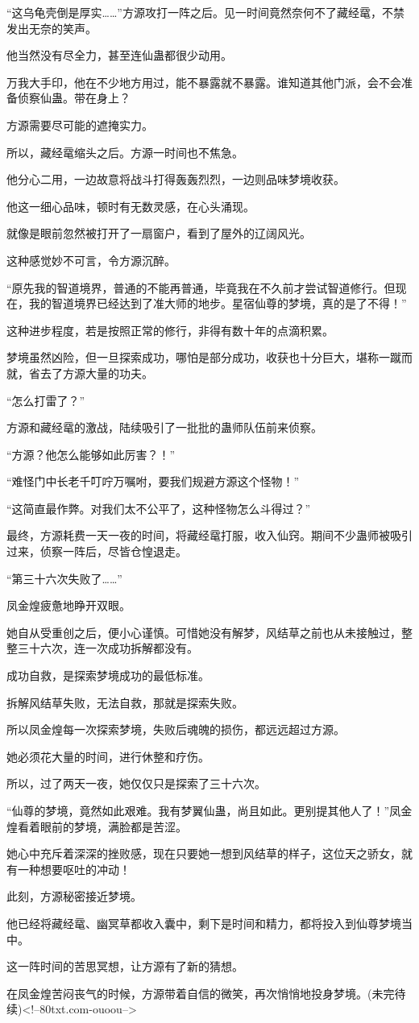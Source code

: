 \begin{this_body}
“这乌龟壳倒是厚实……”方源攻打一阵之后。见一时间竟然奈何不了藏经鼋，不禁发出无奈的笑声。

他当然没有尽全力，甚至连仙蛊都很少动用。

万我大手印，他在不少地方用过，能不暴露就不暴露。谁知道其他门派，会不会准备侦察仙蛊。带在身上？

方源需要尽可能的遮掩实力。

所以，藏经鼋缩头之后。方源一时间也不焦急。

他分心二用，一边故意将战斗打得轰轰烈烈，一边则品味梦境收获。

他这一细心品味，顿时有无数灵感，在心头涌现。

就像是眼前忽然被打开了一扇窗户，看到了屋外的辽阔风光。

这种感觉妙不可言，令方源沉醉。

“原先我的智道境界，普通的不能再普通，毕竟我在不久前才尝试智道修行。但现在，我的智道境界已经达到了准大师的地步。星宿仙尊的梦境，真的是了不得！”

这种进步程度，若是按照正常的修行，非得有数十年的点滴积累。

梦境虽然凶险，但一旦探索成功，哪怕是部分成功，收获也十分巨大，堪称一蹴而就，省去了方源大量的功夫。

“怎么打雷了？”

方源和藏经鼋的激战，陆续吸引了一批批的蛊师队伍前来侦察。

“方源？他怎么能够如此厉害？！”

“难怪门中长老千叮咛万嘱咐，要我们规避方源这个怪物！”

“这简直最作弊。对我们太不公平了，这种怪物怎么斗得过？”

最终，方源耗费一天一夜的时间，将藏经鼋打服，收入仙窍。期间不少蛊师被吸引过来，侦察一阵后，尽皆仓惶退走。

“第三十六次失败了……”

凤金煌疲惫地睁开双眼。

她自从受重创之后，便小心谨慎。可惜她没有解梦，风结草之前也从未接触过，整整三十六次，连一次成功拆解都没有。

成功自救，是探索梦境成功的最低标准。

拆解风结草失败，无法自救，那就是探索失败。

所以凤金煌每一次探索梦境，失败后魂魄的损伤，都远远超过方源。

她必须花大量的时间，进行休整和疗伤。

所以，过了两天一夜，她仅仅只是探索了三十六次。

“仙尊的梦境，竟然如此艰难。我有梦翼仙蛊，尚且如此。更别提其他人了！”凤金煌看着眼前的梦境，满脸都是苦涩。

她心中充斥着深深的挫败感，现在只要她一想到风结草的样子，这位天之骄女，就有一种想要呕吐的冲动！

此刻，方源秘密接近梦境。

他已经将藏经鼋、幽冥草都收入囊中，剩下是时间和精力，都将投入到仙尊梦境当中。

这一阵时间的苦思冥想，让方源有了新的猜想。

在凤金煌苦闷丧气的时候，方源带着自信的微笑，再次悄悄地投身梦境。(未完待续)<!--80txt.com-ouoou-->

\end{this_body}

